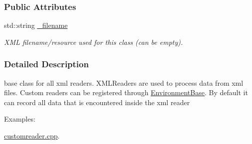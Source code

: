 \subsubsection*{Public Attributes}
\begin{DoxyCompactItemize}
\item 
\hypertarget{classOpenRAVE_1_1BaseXMLReader_a895aefe990ffe9af66bb5cd4e37d3579}{
std::string \hyperlink{classOpenRAVE_1_1BaseXMLReader_a895aefe990ffe9af66bb5cd4e37d3579}{\_\-filename}}
\label{classOpenRAVE_1_1BaseXMLReader_a895aefe990ffe9af66bb5cd4e37d3579}

\begin{DoxyCompactList}\small\item\em XML filename/resource used for this class (can be empty). \item\end{DoxyCompactList}\end{DoxyCompactItemize}


\subsubsection{Detailed Description}
base class for all xml readers. XMLReaders are used to process data from xml files. Custom readers can be registered through \hyperlink{classOpenRAVE_1_1EnvironmentBase}{EnvironmentBase}. By default it can record all data that is encountered inside the xml reader \begin{Desc}
\item[Examples: ]\par


\hyperlink{customreader_8cpp-example}{customreader.cpp}.

\end{Desc}


